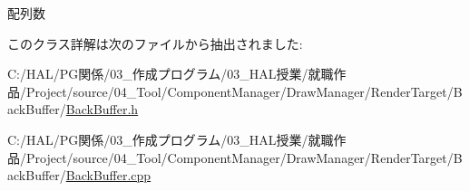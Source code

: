 配列数 



このクラス詳解は次のファイルから抽出されました\+:\begin{DoxyCompactItemize}
\item 
C\+:/\+H\+A\+L/\+P\+G関係/03\+\_\+作成プログラム/03\+\_\+\+H\+A\+L授業/就職作品/\+Project/source/04\+\_\+\+Tool/\+Component\+Manager/\+Draw\+Manager/\+Render\+Target/\+Back\+Buffer/\mbox{\hyperlink{_back_buffer_8h}{Back\+Buffer.\+h}}\item 
C\+:/\+H\+A\+L/\+P\+G関係/03\+\_\+作成プログラム/03\+\_\+\+H\+A\+L授業/就職作品/\+Project/source/04\+\_\+\+Tool/\+Component\+Manager/\+Draw\+Manager/\+Render\+Target/\+Back\+Buffer/\mbox{\hyperlink{_back_buffer_8cpp}{Back\+Buffer.\+cpp}}\end{DoxyCompactItemize}
